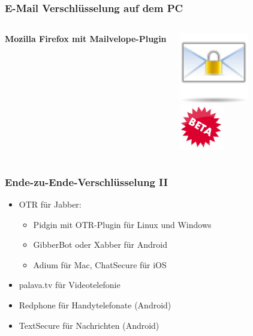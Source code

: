 \documentclass[12pt]{beamer}
\begin{document}
\begin{frame}
   \frametitle{E-Mail Verschlüsselung auf dem PC}
   \begin{columns}[T]
      \column{5cm}
      \begin{center}
              \textbf{\Large{}Mozilla Firefox mit Mailvelope-Plugin}{\Large \par}
     \end{center}
      \column{2cm}
      \includegraphics[width=0.8\textwidth]{img/502400-64}
         \vspace{1cm}
         \includegraphics[width=2cm]{img/Beta-badge}
    \end{columns}
\end{frame}

\begin{frame}
  \frametitle{Ende-zu-Ende-Verschlüsselung II}
  \begin{itemize}
    \item<2-> OTR für Jabber:
      \begin{itemize}
        \item Pidgin mit OTR-Plugin für Linux und Windows
        \item GibberBot oder Xabber für Android
        \item Adium für Mac, ChatSecure für iOS
      \end{itemize}
    \item<3-> palava.tv für Videotelefonie
    \item<4-> Redphone für Handytelefonate (Android)
    \item<5-> TextSecure für Nachrichten (Android)
  \end{itemize}
\end{frame}
\end{document}
